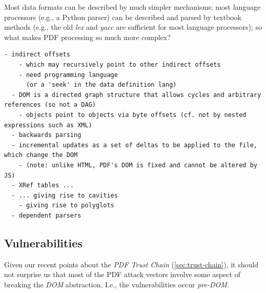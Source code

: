 Most data formats can be described by much simpler mechanisms;
most language processors (e.g., a Python parser) can be described and parsed by
textbook methods (e.g., the old \emph{lex} and \emph{yacc} are sufficient for
most language processors);
so what makes PDF processing so much more complex?
\begin{lstlisting}[style=meta]
  - indirect offsets
    - which may recursively point to other indirect offsets
    - need programming language
      (or a 'seek' in the data definition lang)
  - DOM is a directed graph structure that allows cycles and arbitrary references (so not a DAG)
    - objects point to objects via byte offsets (cf. not by nested expressions such as XML)  
  - backwards parsing
  - incremental updates as a set of deltas to be applied to the file, which change the DOM
    - (note: unlike HTML, PDF's DOM is fixed and cannot be altered by JS)
  - XRef tables ...
  - ... giving rise to cavities
    - giving rise to polyglots
  - dependent parsers
\end{lstlisting}

\subsection{}


\subsection{Vulnerabilities }
\label{sec:vulnerabilities}


Given our recent points about the \emph{PDF Trust Chain}
(\cref{sec:trust-chain}),
it should not surprise us that most of the PDF attack vectors
involve some aspect of breaking the \emph{DOM} abstraction.
I.e., the vulnerabilities occur \emph{pre-DOM}.

